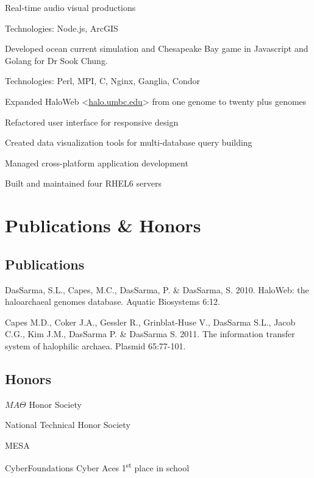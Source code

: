 \documentclass[letterpaper]{resume}
\begin{document}
\begin{compactitem}
\item Real-time audio visual productions
\end{compactitem}

\begin{compactitem}
\item Technologies: Node.js, ArcGIS
\item Developed ocean current simulation and Chesapeake Bay game in Javascript and Golang for Dr Sook Chung.
\end{compactitem}

\begin{compactitem}
\item Technologies: Perl, MPI, C, Nginx, Ganglia, Condor
\item Expanded HaloWeb <\href{halo.umbc.edu}{halo.umbc.edu}> from one genome to twenty plus genomes
\item Refactored user interface for responsive design
\item Created data visualization tools for multi-database query building
\item Managed cross-platform application development
\item Built and maintained four RHEL6 servers
\end{compactitem}

\section{Publications \& Honors}

\subsection{Publications}

\begin{compactitem}
\item DasSarma, S.L., Capes, M.C., DasSarma, P. \& DasSarma, S. 2010. HaloWeb: the haloarchaeal genomes database. Aquatic Biosystems 6:12.
\item Capes M.D., Coker J.A., Gessler R., Grinblat-Huse V., DasSarma S.L., Jacob C.G., Kim J.M., DasSarma P. \& DasSarma S. 2011. The information transfer system of halophilic archaea. Plasmid 65:77-101.
\end{compactitem}

\subsection{Honors}

\begin{compactitem}
\item $MA\Theta$ Honor Society
\item National Technical Honor Society
\item MESA
\item CyberFoundations Cyber Aces 1\textsuperscript{st} place in school
\end{compactitem}
\end{document}
